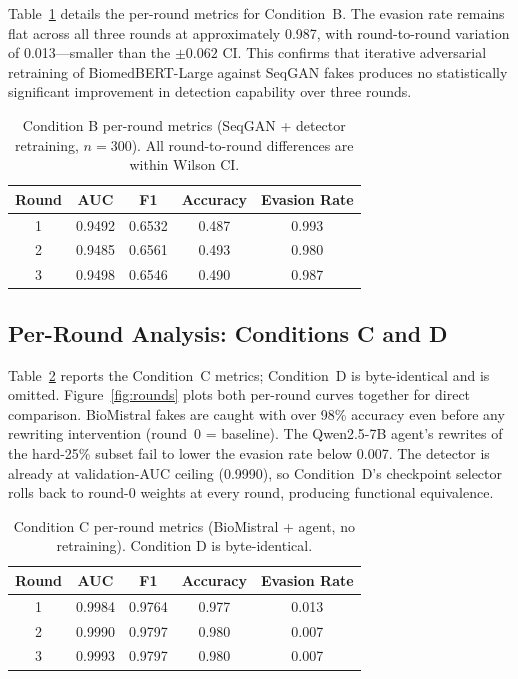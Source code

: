 \documentclass[12pt,a4paper]{article}
\begin{document}
Table~\ref{tab:b_rounds} details the per-round metrics for Condition~B.
The evasion rate remains flat across all three rounds at approximately
0.987, with round-to-round variation of 0.013—smaller than the $\pm 0.062$
CI. This confirms that iterative adversarial retraining of BiomedBERT-Large
against SeqGAN fakes produces no statistically significant improvement in
detection capability over three rounds.

\begin{table}[H]
\centering
\caption{Condition B per-round metrics (SeqGAN + detector retraining, $n=300$).
All round-to-round differences are within Wilson CI.}
\label{tab:b_rounds}
\renewcommand{\arraystretch}{1.25}
\begin{tabular}{@{}ccccc@{}}
\toprule
\textbf{Round} & \textbf{AUC} & \textbf{F1} & \textbf{Accuracy} & \textbf{Evasion Rate} \\
\midrule
1 & 0.9492 & 0.6532 & 0.487 & 0.993 \\
2 & 0.9485 & 0.6561 & 0.493 & 0.980 \\
3 & 0.9498 & 0.6546 & 0.490 & 0.987 \\
\bottomrule
\end{tabular}
\end{table}

\subsection{Per-Round Analysis: Conditions C and D}

Table~\ref{tab:c_rounds} reports the Condition~C metrics; Condition~D is
byte-identical and is omitted. Figure~\ref{fig:rounds} plots both per-round
curves together for direct comparison. BioMistral fakes are caught with over 98\%
accuracy even before any rewriting intervention (round~0 = baseline).
The Qwen2.5-7B agent's rewrites of the hard-25\% subset fail to lower
the evasion rate below 0.007. The detector is already at validation-AUC
ceiling (0.9990), so Condition~D's checkpoint selector rolls back to
round-0 weights at every round, producing functional equivalence.

\begin{table}[H]
\centering
\caption{Condition C per-round metrics (BioMistral + agent, no retraining).
Condition D is byte-identical.}
\label{tab:c_rounds}
\renewcommand{\arraystretch}{1.25}
\begin{tabular}{@{}ccccc@{}}
\toprule
\textbf{Round} & \textbf{AUC} & \textbf{F1} & \textbf{Accuracy} & \textbf{Evasion Rate} \\
\midrule
1 & 0.9984 & 0.9764 & 0.977 & 0.013 \\
2 & 0.9990 & 0.9797 & 0.980 & 0.007 \\
3 & 0.9993 & 0.9797 & 0.980 & 0.007 \\
\bottomrule
\end{tabular}
\end{table}
\end{document}
